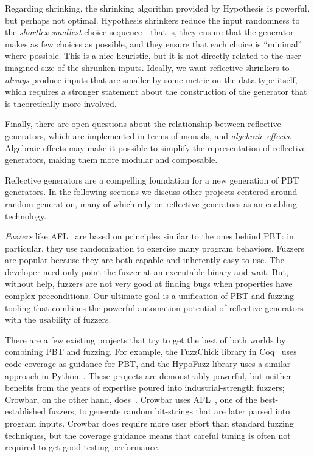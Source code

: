 Regarding shrinking, the shrinking algorithm provided by Hypothesis is powerful,
but perhaps not optimal. Hypothesis shrinkers reduce the input randomness to the
{\em shortlex smallest} choice sequence---that is, they ensure that the
generator makes as few choices as possible, and they ensure that each choice is
``minimal'' where possible. This is a nice heuristic, but it is not directly
related to the user-imagined size of the shrunken inputs. Ideally, we want
reflective shrinkers to {\em always} produce inputs that are smaller by some
metric on the data-type itself, which requires a stronger statement about the
construction of the generator that is theoretically more involved.

Finally, there are open questions about the relationship between reflective
generators, which are implemented in terms of monads, and {\em algebraic
effects}. Algebraic effects may make it possible to simplify the representation
of reflective generators, making them more modular and composable.

Reflective generators are a compelling foundation for a new generation of PBT
generators. In the following sections we discuss other projects centered around
random generation, many of which rely on reflective generators as an enabling
technology.

\iflater{}\fi

%
{\em Fuzzers} like AFL~\cite{afl-readme} are based on principles
similar to the
ones behind PBT: in particular, they use randomization to exercise many
program behaviors. Fuzzers are popular because they are both capable and
inherently easy to use. The developer need only point the fuzzer at an
executable binary and
wait. But, without help, fuzzers are not very good at finding
bugs when properties have complex preconditions.
Our ultimate goal is a unification of PBT and fuzzing tooling that combines the
powerful automation potential of reflective generators with the usability of
fuzzers.

There are a few existing projects that try to get the best of both worlds by
combining PBT and fuzzing.
For example, the FuzzChick library in Coq~\cite{OLDlampropoulos19fuzzchick}
uses code coverage as guidance for PBT, and the HypoFuzz library uses a
similar approach in Python~\cite{hatfield-dodds_hypofuzz_nodate}. These projects
are demonstrably powerful, but neither benefits from the years of expertise
poured into industrial-strength fuzzers; Crowbar, on the other hand,
does~\cite{dolan2017testing}. Crowbar uses
AFL~\cite{afl-readme}, one of the best-established
fuzzers, to generate random bit-strings that are later parsed into program
inputs. Crowbar does require more user effort than standard fuzzing techniques,
but the coverage guidance means that careful tuning is often not required to get
good testing performance.

